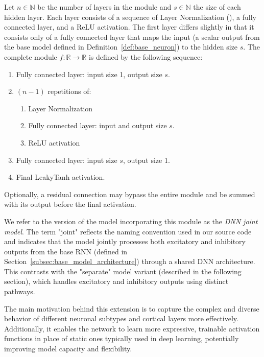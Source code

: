 \begin{defn}
    Let $n \in \mathbb{N}$ be the number of layers in the module and $s \in \mathbb{N}$ the size of each hidden layer. Each layer consists of a sequence of Layer Normalization (\citet{ba2016layernormalization}), a fully connected layer, and a ReLU activation. The first layer differs slightly in that it consists only of a fully connected layer that maps the input (a scalar output from the base model defined in Definition~\ref{def:base_neuron}) to the hidden size $s$. The complete module $f: \mathbb{R} \to \mathbb{R}$ is defined by the following sequence:
    
    \begin{enumerate}
        \item Fully connected layer: input size 1, output size $s$.
        \item $(n-1)$ repetitions of:
        \begin{enumerate}
            \item Layer Normalization
            \item Fully connected layer: input and output size $s$.
            \item ReLU activation
        \end{enumerate}
        \item Fully connected layer: input size $s$, output size 1.
        \item Final LeakyTanh activation.
    \end{enumerate}
    
    Optionally, a residual connection may bypass the entire module and be summed with its output before the final activation.
\end{defn}
\label{def:dnn_joint}

We refer to the version of the model incorporating this module as the \emph{DNN joint model}. The term "joint" reflects the naming convention used in our source code and indicates that the model jointly processes both excitatory and inhibitory outputs from the base RNN (defined in Section~\ref{subsec:base_model_architecture}) through a shared DNN architecture. This contrasts with the "separate" model variant (described in the following section), which handles excitatory and inhibitory outputs using distinct pathways.

The main motivation behind this extension is to capture the complex and diverse behavior of different neuronal subtypes and cortical layers more effectively. Additionally, it enables the network to learn more expressive, trainable activation functions in place of static ones typically used in deep learning, potentially improving model capacity and flexibility.


